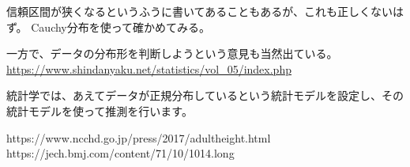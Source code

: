 信頼区間が狭くなるというふうに書いてあることもあるが、これも正しくないはず。
Cauchy分布を使って確かめてみる。
\fi 


一方で、データの分布形を判断しようという意見も当然出ている。
\url{https://www.shindanyaku.net/statistics/vol_05/index.php}
\fi 

統計学では、あえてデータが正規分布しているという統計モデルを設定し、その統計モデルを使って推測を行います。

https://www.ncchd.go.jp/press/2017/adultheight.html
https://jech.bmj.com/content/71/10/1014.long

\fi 
